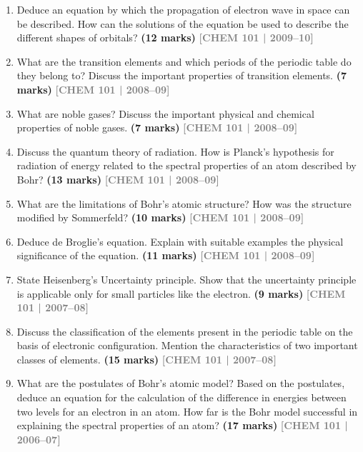 \documentclass[12pt,a3paper]{article}
\newcommand{\yr}[1]{\hfill\textcolor{gray}{\small\textbf{[#1]}}}
\newcommand{\mk}[1]{\textcolor{orange!70!black}{\small\textbf{(#1 marks)}}}
\begin{document}
\begin{enumerate}
\item Deduce an equation by which the propagation of electron wave in space can be described. How can the solutions of the equation be used to describe the different shapes of orbitals? \mk{12}
\yr{CHEM 101 | 2009--10}



\item What are the transition elements and which periods of the periodic table do they belong to? Discuss the important properties of transition elements. \mk{7}
\yr{CHEM 101 | 2008--09}



\item What are noble gases? Discuss the important physical and chemical properties of noble gases. \mk{7}
\yr{CHEM 101 | 2008--09}



\item Discuss the quantum theory of radiation. How is Planck's hypothesis for radiation of energy related to the spectral properties of an atom described by Bohr? \mk{13}
\yr{CHEM 101 | 2008--09}



\item What are the limitations of Bohr's atomic structure? How was the structure modified by Sommerfeld? \mk{10}
\yr{CHEM 101 | 2008--09}



\item Deduce de Broglie's equation. Explain with suitable examples the physical significance of the equation. \mk{11}
\yr{CHEM 101 | 2008--09}



\item State Heisenberg's Uncertainty principle. Show that the uncertainty principle is applicable only for small particles like the electron. \mk{9}
\yr{CHEM 101 | 2007--08}



\item Discuss the classification of the elements present in the periodic table on the basis of electronic configuration. Mention the characteristics of two important classes of elements. \mk{15}
\yr{CHEM 101 | 2007--08}




\item What are the postulates of Bohr's atomic model? Based on the postulates, deduce an equation for the calculation of the difference in energies between two levels for an electron in an atom. How far is the Bohr model successful in explaining the spectral properties of an atom? \mk{17}
\yr{CHEM 101 | 2006--07}




\end{enumerate}
\end{document}
